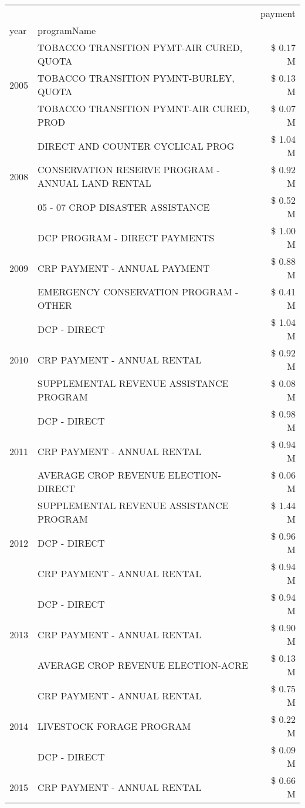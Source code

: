 \begin{tabular}{llr}
\toprule
 &  & payment \\
year & programName &  \\
\midrule
\multirow[t]{3}{*}{2005} & TOBACCO TRANSITION PYMT-AIR CURED, QUOTA & \$ 0.17 M \\
 & TOBACCO TRANSITION PYMNT-BURLEY, QUOTA & \$ 0.13 M \\
 & TOBACCO TRANSITION PYMNT-AIR CURED, PROD & \$ 0.07 M \\
\cline{1-3}
\multirow[t]{3}{*}{2008} & DIRECT AND COUNTER CYCLICAL PROG & \$ 1.04 M \\
 & CONSERVATION RESERVE PROGRAM - ANNUAL LAND RENTAL & \$ 0.92 M \\
 & 05 - 07 CROP DISASTER ASSISTANCE & \$ 0.52 M \\
\cline{1-3}
\multirow[t]{3}{*}{2009} & DCP PROGRAM - DIRECT PAYMENTS & \$ 1.00 M \\
 & CRP PAYMENT - ANNUAL PAYMENT & \$ 0.88 M \\
 & EMERGENCY CONSERVATION PROGRAM - OTHER & \$ 0.41 M \\
\cline{1-3}
\multirow[t]{3}{*}{2010} & DCP - DIRECT & \$ 1.04 M \\
 & CRP PAYMENT - ANNUAL RENTAL & \$ 0.92 M \\
 & SUPPLEMENTAL REVENUE ASSISTANCE PROGRAM & \$ 0.08 M \\
\cline{1-3}
\multirow[t]{3}{*}{2011} & DCP - DIRECT & \$ 0.98 M \\
 & CRP PAYMENT - ANNUAL RENTAL & \$ 0.94 M \\
 & AVERAGE CROP REVENUE ELECTION-DIRECT & \$ 0.06 M \\
\cline{1-3}
\multirow[t]{3}{*}{2012} & SUPPLEMENTAL REVENUE ASSISTANCE PROGRAM & \$ 1.44 M \\
 & DCP - DIRECT & \$ 0.96 M \\
 & CRP PAYMENT - ANNUAL RENTAL & \$ 0.94 M \\
\cline{1-3}
\multirow[t]{3}{*}{2013} & DCP - DIRECT & \$ 0.94 M \\
 & CRP PAYMENT - ANNUAL RENTAL & \$ 0.90 M \\
 & AVERAGE CROP REVENUE ELECTION-ACRE & \$ 0.13 M \\
\cline{1-3}
\multirow[t]{3}{*}{2014} & CRP PAYMENT - ANNUAL RENTAL & \$ 0.75 M \\
 & LIVESTOCK FORAGE PROGRAM & \$ 0.22 M \\
 & DCP - DIRECT & \$ 0.09 M \\
\cline{1-3}
\multirow[t]{3}{*}{2015} & CRP PAYMENT - ANNUAL RENTAL & \$ 0.66 M \\

\end{tabular}
